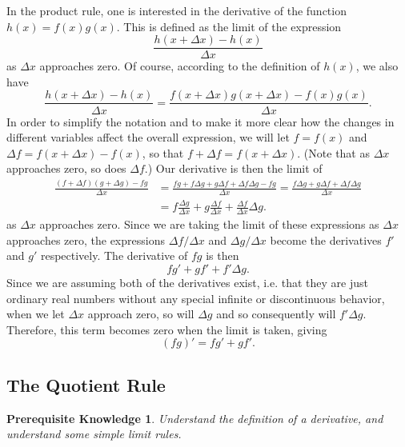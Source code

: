 \documentclass{myarticle}
\theoremstyle{nospace}
\newtheorem*{oldprereq}{Prerequisite Knowledge}
\newenvironment{prereq}{\begin{mdframed}\begin{oldprereq}}{\end{oldprereq}\end{mdframed}}
\newtheorem{old series theorem}{Theorem}
\newenvironment{series theorem}{\begin{mdframed}\begin{old series theorem}}{\end{old series theorem}\end{mdframed}}
\begin{document}
In the product rule, one is interested in the derivative of the function $h(x) = f(x)g(x)$. This is defined as the limit of the expression \[ \frac{h(x + \Delta x) - h(x)}{\Delta x} \] as $\Delta x$ approaches zero. Of course, according to the definition of $h(x)$, we also have \[ \frac{h(x + \Delta x) - h(x)}{\Delta x} = \frac{f(x + \Delta x)g(x + \Delta x) - f(x)g(x)}{\Delta x}. \] In order to simplify the notation and to make it more clear how the changes in different variables affect the overall expression, we will let $f = f(x)$ and $\Delta f = f(x + \Delta x) - f(x)$, so that $f + \Delta f = f(x + \Delta x)$. (Note that as $\Delta x$ approaches zero, so does $\Delta f$.) Our derivative is then the limit of
\begin{equation*} \begin{split}
\frac{(f + \Delta f)(g + \Delta g) - fg}{\Delta x} &= \frac{fg + f\Delta g + g\Delta f + \Delta f \Delta g - fg}{\Delta x} = \frac{f\Delta g + g\Delta f + \Delta f \Delta g}{\Delta x} \\
&= f\frac{\Delta g}{\Delta x} + g\frac{\Delta f}{\Delta x} + \frac{\Delta f}{\Delta x}\Delta g.
\end{split} \end{equation*}
as $\Delta x$ approaches zero. Since we are taking the limit of these expressions as $\Delta x$ approaches zero, the expressions $\Delta f/\Delta x$ and $\Delta g/\Delta x$ become the derivatives $f'$ and $g'$ respectively. The derivative of $fg$ is then \[ fg' + gf' + f'\Delta g. \] Since we are assuming both of the derivatives exist, i.e. that they are just ordinary real numbers without any special infinite or discontinuous behavior, when we let $\Delta x$ approach zero, so will $\Delta g$ and so consequently will $f'\Delta g$. Therefore, this term becomes zero when the limit is taken, giving \[ (fg)' = fg' + gf'. \]

\subsection{The Quotient Rule} \label{sec:quotient rule}
\begin{prereq} Understand the definition of a derivative, and understand some simple limit rules. \end{prereq}
\end{document}

